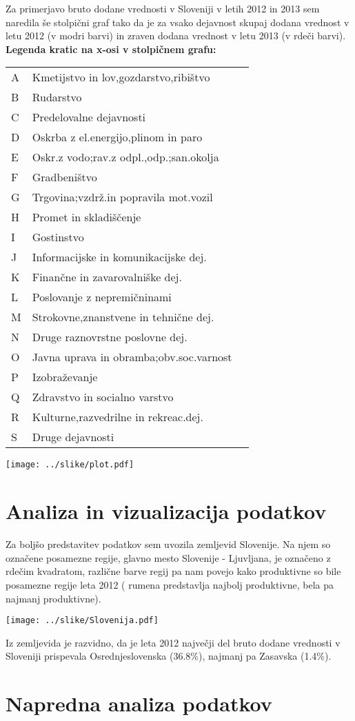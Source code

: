 \documentclass[a4paper, 11pt]{article}
\begin{document}
Za primerjavo bruto dodane vrednosti v Sloveniji v letih 2012 in 2013 sem naredila še stolpični graf tako da je za vsako dejavnost skupaj dodana vrednost v letu 2012 (v  modri barvi) in zraven dodana vrednost v letu 2013 (v rdeči barvi). 
\newline
\textbf{Legenda kratic na x-osi v stolpičnem grafu:}
\begin{table}[h]
\begin{tabular}{lll}
A  & Kmetijstvo in lov,gozdarstvo,ribištvo \\
B & Rudarstvo  \\
C & Predelovalne dejavnosti  \\
D & Oskrba z el.energijo,plinom in paro	\\
E & Oskr.z vodo;rav.z odpl.,odp.;san.okolja	\\
F & Gradbeništvo	\\
G & Trgovina;vzdrž.in popravila mot.vozil	\\
H & Promet in skladiščenje	\\
I & Gostinstvo	\\
J & Informacijske in komunikacijske dej.\\	
K & Finančne in zavarovalniške dej.	\\
L & Poslovanje z nepremičninami	\\
M & Strokovne,znanstvene in tehnične dej.	\\
N & Druge raznovrstne poslovne dej.	\\
O & Javna uprava in obramba;obv.soc.varnost \\
P & Izobraževanje	\\
Q & Zdravstvo in socialno varstvo	\\
R & Kulturne,razvedrilne in rekreac.dej.\\	
S & Druge dejavnosti
\end{tabular}
\end{table}


\begin{center}

\texttt{[image: ../slike/plot.pdf]}

\end{center}


\section{Analiza in vizualizacija podatkov}


Za boljšo predstavitev podatkov sem uvozila zemljevid Slovenije. Na njem so označene posamezne regije, glavno mesto Slovenije - Ljuvljana, je označeno z rdečim kvadratom, različne barve regij pa nam povejo kako produktivne so bile posamezne regije leta 2012 ( rumena predstavlja najbolj produktivne, bela pa najmanj produktivne).

\newpage
\begin{center}
\texttt{[image: ../slike/Slovenija.pdf]}
\end{center}

Iz zemljevida je razvidno, da je leta 2012 največji del bruto dodane vrednosti v Sloveniji prispevala Osrednjeslovenska (36.8\%), najmanj pa Zasavska (1.4\%).


\section{Napredna analiza podatkov}
\end{document}
